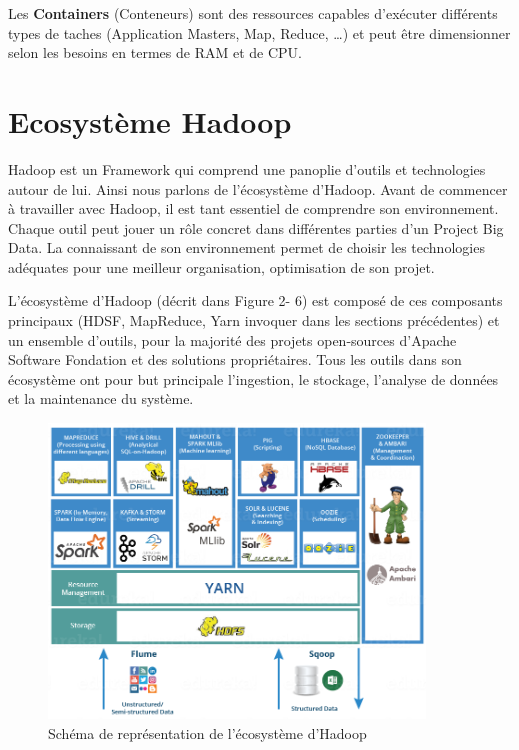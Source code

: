 \documentclass[12pt,french]{book}
\begin{document}
Les \textbf{Containers} (Conteneurs) sont des ressources capables d’exécuter différents types de taches (Application Masters, Map, Reduce, …) et peut être dimensionner selon les besoins en termes de RAM et de CPU.

\section{Ecosystème Hadoop}

Hadoop est un Framework qui comprend une panoplie d’outils et technologies autour de lui. Ainsi nous parlons de l’écosystème d’Hadoop. Avant de commencer à travailler avec Hadoop, il est tant essentiel de comprendre son environnement. Chaque outil peut jouer un rôle concret dans différentes parties d’un Project Big Data. La connaissant de son environnement permet de choisir les technologies adéquates pour une meilleur organisation, optimisation de son projet.

L’écosystème d’Hadoop (décrit dans Figure 2- 6) est composé de ces composants principaux (HDSF, MapReduce, Yarn invoquer dans les sections précédentes) et un ensemble d’outils, pour la majorité des projets open-sources d’Apache Software Fondation et des solutions propriétaires.  Tous les outils dans son écosystème ont pour but principale l’ingestion, le stockage, l’analyse de données et la maintenance du système. 

\begin{figure}[ht]
	\centering
	\includegraphics[width=10cm]{hadoopEco}
	\caption[Schéma de représentation de l'écosystème d'Hadoop]{Schéma de représentation de l'écosystème d'Hadoop \footnotemark}
\end{figure}

\end{document}

